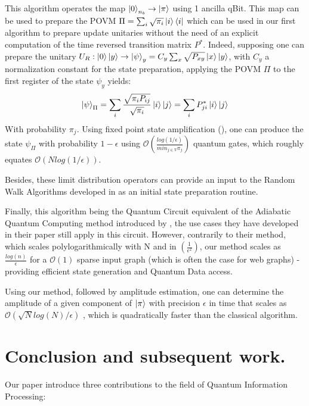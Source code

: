 \documentclass[sn-mathphys]{sn-jnl}%
\theoremstyle{thmstyleone}%
\theoremstyle{thmstyletwo}%
\theoremstyle{thmstylethree}%
\begin{document}
This algorithm operates the map $\ket{0}_{n_b} \rightarrow \ket{\pi}$
using 1 ancilla qBit. This map can be used to prepare the POVM
$\Pi = \sum_i \sqrt{\pi_i} \ket{i}\bra{i}$ which can be used in our
first algorithm to prepare update unitaries without the need of an
explicit computation of the time reversed transition matrix
$P^*$. Indeed, supposing one can prepare the unitary
$U_R : \ket{0}\ket{y} \rightarrow \ket{\psi}_y = C_y \sum_x
\sqrt{P_{xy}} \ket{x} \ket{y}$, with $C_y$ a normalization constant
for the state preparation, applying the POVM $\Pi$ to the first
register of the state $\psi_y$ yields:
\begin{equation}
    \ket{\psi}_\Pi = \sum_i \frac{\sqrt{\pi_i P_{ij}}}{\sqrt{\pi_i}} \ket{i}\ket{j} = \sum_i P_{ji}^* \ket{i}\ket{j}
\end{equation}
With probability $\pi_j$. Using fixed point state amplification
(\cite{gilyen_su_low_wiebe_2019}), one can produce the state
$\psi_\Pi$ with probability $1-\epsilon$ using
$\mathcal{O}(\frac{log(1/\epsilon)}{min_{j\in V} \pi_j})$ quantum
gates, which roughly equates $\mathcal{O}(N log(1/\epsilon))$.

Besides, these limit distribution operators can provide an input to
the Random Walk Algorithms developed in
\cite{gilyen_su_low_wiebe_2019, Magniez_2011, Krovi_2015} as an
initial state preparation routine.

Finally, this algorithm being the Quantum Circuit equivalent of the
Adiabatic Quantum Computing method introduced by
\cite{garnerone_zanardi_lidar_2012}, the use cases they have developed
in their paper still apply in this circuit. However, contrarily to
their method, which scales polylogarithmically with N and in
$(\frac{1}{\epsilon^2})$, our method scales as
$\frac{log(n)}{\epsilon}$ for a $\mathcal{O}(1)$ sparse input graph
(which is often the case for web graphs) - providing efficient state
generation and Quantum Data access.

Using our method, followed by amplitude estimation, one can determine
the amplitude of a given component of $\ket{\pi}$ with precision
$\epsilon$ in time that scales as
$\mathcal{O}(\sqrt{N}log(N) / \epsilon)$
\cite{brassard_hoyer_mosca_tapp_2002}, which is quadratically faster
than the classical algorithm.

\section{Conclusion and subsequent work.}
Our paper introduce three contributions to the field of Quantum
Information Processing:
\end{document}

